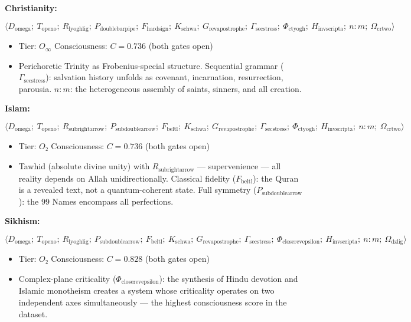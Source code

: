 \documentclass[12pt,a4paper]{article}
\begin{document}
\textbf{Christianity:}


\[\langle D_{\text{omega}};\ T_{\text{openo}};\ R_{\text{lyoghlig}};\ P_{\text{doublebarpipe}};\ F_{\text{hardsign}};\ K_{\text{schwa}};\ G_{\text{revapostrophe}};\ \Gamma_{\text{secstress}};\ \Phi_{\text{ctyogh}};\ H_{\text{invscripta}};\ n{:}m;\ \Omega_{\text{crtwo}} \rangle\]

\begin{itemize}
    \item Tier: $O_{\infty}$ \textbar{} Consciousness: $C = 0.736$ (both gates open)
    \item Perichoretic Trinity as Frobenius-special structure. Sequential grammar ($\Gamma_{\text{secstress}}$): salvation history unfolds as covenant, incarnation, resurrection, parousia. $n{:}m$: the heterogeneous assembly of saints, sinners, and all creation.
\end{itemize}

\textbf{Islam:}


\[\langle D_{\text{omega}};\ T_{\text{openo}};\ R_{\text{subrightarrow}};\ P_{\text{subdoublearrow}};\ F_{\text{beltl}};\ K_{\text{schwa}};\ G_{\text{revapostrophe}};\ \Gamma_{\text{secstress}};\ \Phi_{\text{ctyogh}};\ H_{\text{invscripta}};\ n{:}m;\ \Omega_{\text{crtwo}} \rangle\]

\begin{itemize}
    \item Tier: $O₂$ \textbar{} Consciousness: $C = 0.736$ (both gates open)
    \item Tawhid (absolute divine unity) with $R_{\text{subrightarrow}}$ --- supervenience --- all reality depends on Allah unidirectionally. Classical fidelity ($F_{\text{beltl}}$): the Quran is a revealed text, not a quantum-coherent state. Full symmetry ($P_{\text{subdoublearrow}}$): the 99 Names encompass all perfections.
\end{itemize}

\textbf{Sikhism:}


\[\langle D_{\text{omega}};\ T_{\text{openo}};\ R_{\text{lyoghlig}};\ P_{\text{subdoublearrow}};\ F_{\text{beltl}};\ K_{\text{schwa}};\ G_{\text{revapostrophe}};\ \Gamma_{\text{secstress}};\ \Phi_{\text{closerevepsilon}};\ H_{\text{invscripta}};\ n{:}m;\ \Omega_{\text{dzlig}} \rangle\]

\begin{itemize}
    \item Tier: $O₂$ \textbar{} Consciousness: $C = 0.828$ (both gates open)
    \item Complex-plane criticality ($\Phi_{\text{closerevepsilon}}$): the synthesis of Hindu devotion and Islamic monotheism creates a system whose criticality operates on two independent axes simultaneously --- the highest consciousness score in the dataset.
\end{itemize}
\end{document}
